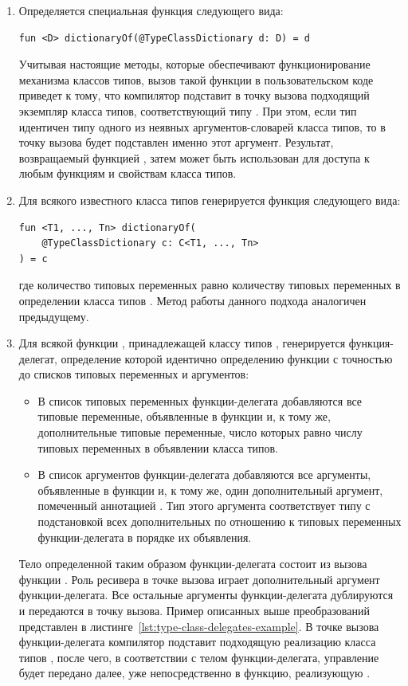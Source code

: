 \begin{enumerate}
    \item Определяется специальная функция следующего вида: 
    \begin{lstlisting}[style={wo_caption}]
fun <D> dictionaryOf(@TypeClassDictionary d: D) = d
    \end{lstlisting}
    Учитывая настоящие методы, которые обеспечивают функционирование механизма классов типов, вызов такой функции в пользовательском коде приведет к тому, что компилятор подставит в точку вызова подходящий экземпляр класса типов, соответствующий типу . При этом, если тип  идентичен типу одного из неявных аргументов-словарей класса типов, то в точку вызова будет подставлен именно этот аргумент. Результат, возвращаемый функцией , затем может быть использован для доступа к любым функциям и свойствам класса типов.  
    \item Для всякого известного класса типов  генерируется функция следующего вида:
    \begin{lstlisting}[style={wo_caption}]
fun <T1, ..., Tn> dictionaryOf(
    @TypeClassDictionary c: C<T1, ..., Tn>
) = c
    \end{lstlisting}
    где количество типовых переменных равно количеству типовых переменных в определении класса типов . Метод работы данного подхода аналогичен предыдущему. 
    \item Для всякой функции , принадлежащей классу типов , генерируется функция-делегат, определение которой идентично определению функции  с точностью до списков типовых переменных и аргументов:
    \begin{itemize}
        \item В список типовых переменных функции-делегата добавляются все типовые переменные, объявленные в функции  и, к тому же, дополнительные типовые переменные, число которых равно числу типовых переменных в объявлении класса типов.
        \item В список аргументов функции-делегата добавляются все аргументы, объявленные в функции  и, к тому же, один дополнительный аргумент, помеченный аннотацией . Тип этого аргумента соответствует типу  с подстановкой всех дополнительных по отношению к  типовых переменных функции-делегата в порядке их объявления.   
    \end{itemize}
    Тело определенной таким образом функции-делегата  состоит из вызова функции . Роль ресивера в точке вызова играет дополнительный аргумент функции-делегата. Все остальные аргументы функции-делегата дублируются и передаются в точку вызова. Пример описанных выше преобразований представлен в листинге~\ref{lst:type-class-delegates-example}. В точке вызова функции-делегата компилятор подставит подходящую реализацию класса типов , после чего, в соответствии с телом функции-делегата, управление будет передано далее, уже непосредственно в функцию, реализующую . 
\end{enumerate}
